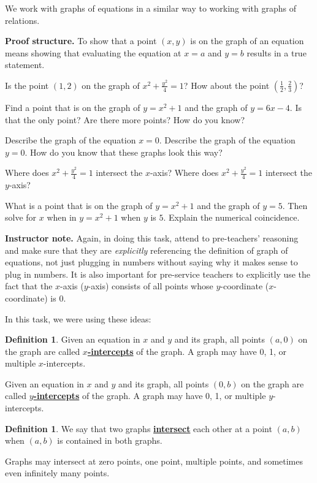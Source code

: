 \documentclass[11pt]{article}
\newcommand\smallnote[1]
	{\begin{mdframed}\raggedright  {\bf Instructor note.} {#1} \end{mdframed}}
\newenvironment{task}
	{\begin{mdframed}[linecolor=lightgray, linewidth=3pt]\raggedright}
	{\end{mdframed}}
\renewcommand\emph[1]{\underline{\bf{#1}}} %
\theoremstyle{definition}
\newtheorem{definition}[theorem]{Definition}
\begin{document}
We work with graphs of equations in a similar way to working with graphs of relations. 

{\bf Proof structure.}
To show that a point $(x, y)$ is on the graph of an equation means showing that evaluating the equation at $x=a$ and $y=b$ results in a true statement.

\begin{task}
Is the point $(1,2)$ on the graph of $x^2+\frac{y^2}{4}=1$?  How about the point $(\frac{1}{2},\frac{2}{3})$? 

Find a point that is on the graph of $y=x^2+1$ and the graph of $y=6x-4$. Is that the only point? Are there more points? How do you know?

Describe the graph of the equation $x=0$. Describe the graph of the equation $y=0$. How do you know that these graphs look this way?

Where does $x^2+\frac{y^2}{4}=1$ intersect the $x$-axis? Where does $x^2+\frac{y^2}{4}=1$ intersect the $y$-axis?

What is a point that is on the graph of $y=x^2+1$ and the graph of $y=5$. Then solve for $x$ when in $y=x^2+1$ when $y$ is $5$. Explain the numerical coincidence.
\end{task}

\smallnote{Again, in doing this task, attend to pre-teachers' reasoning and make sure that they are {\it explicitly} referencing the definition of graph of equations, not just plugging in numbers without saying why it makes sense to plug in numbers. It is also important for pre-service teachers to explicitly use the fact that the $x$-axis ($y$-axis) consists of all points whose $y$-coordinate ($x$-coordinate) is 0.}

In this task, we were using these ideas:

\begin{definition}\label{d: intercepts}
Given an equation in $x$ and $y$ and its graph, all points $(a,0)$ on the graph are called \emph{$x$-intercepts} of the graph. A graph may have 0, 1, or multiple $x$-intercepts.

Given an equation in $x$ and $y$ and its graph, all points $(0,b)$ on the graph are called \emph{$y$-intercepts} of the graph. A graph may have 0, 1, or multiple $y$-intercepts.
\end{definition}

\begin{definition}\label{d: intersection}
We say that two graphs \emph{intersect} each other at a point $(a,b)$ when $(a,b)$ is contained in both graphs.  

Graphs may intersect at zero points, one point, multiple points, and sometimes even infinitely many points.
\end{definition}
\end{document}
